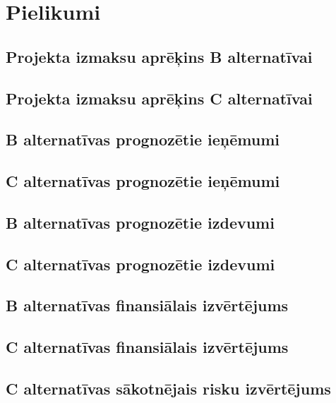 \appendix
\chapter*{Pielikumi}
\renewcommand{\thesection}{\arabic{section}}
    
    
    
    
    
\section{Projekta izmaksu aprēķins B alternatīvai}
	\label{app:B_izmaksas}
    \clearpage
\section{Projekta izmaksu aprēķins C alternatīvai}
	\label{app:C_izmaksas}
    \clearpage
\section{B alternatīvas prognozētie ieņēmumi}
	\label{app:B_ienemumi}
    \clearpage
\section{C alternatīvas prognozētie ieņēmumi}
	\label{app:C_ienemumi}
    \clearpage
\section{B alternatīvas prognozētie izdevumi}
	\label{app:B_izdevumi}
    \clearpage
\section{C alternatīvas prognozētie izdevumi}
	\label{app:C_izdevumi}
    \clearpage
\section{B alternatīvas finansiālais izvērtējums}
	\label{app:B_finansialais_vertejums}
    \clearpage
\section{C alternatīvas finansiālais izvērtējums}
	\label{app:C_finansialais_vertejums}
    \clearpage

\section{C alternatīvas sākotnējais risku izvērtējums}
	\label{app:C_sakotnejie_riski}
    \clearpage
